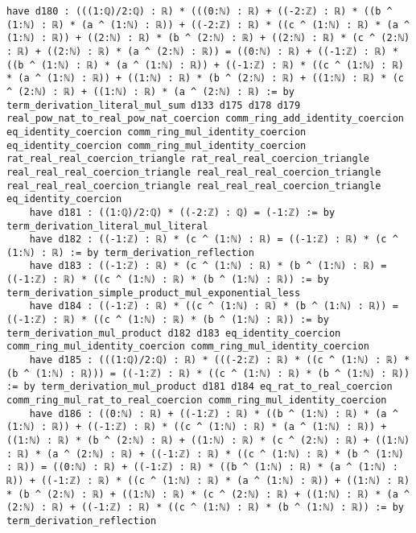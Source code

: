 \documentclass{article}
\begin{document}
\begin{tcolorbox}[colback=white!10, width=\linewidth]
\begin{lstlisting}[language=Lean4]
    have d180 : (((1:ℚ)/2:ℚ) : ℝ) * (((0:ℕ) : ℝ) + ((-2:ℤ) : ℝ) * ((b ^ (1:ℕ) : ℝ) * (a ^ (1:ℕ) : ℝ)) + ((-2:ℤ) : ℝ) * ((c ^ (1:ℕ) : ℝ) * (a ^ (1:ℕ) : ℝ)) + ((2:ℕ) : ℝ) * (b ^ (2:ℕ) : ℝ) + ((2:ℕ) : ℝ) * (c ^ (2:ℕ) : ℝ) + ((2:ℕ) : ℝ) * (a ^ (2:ℕ) : ℝ)) = ((0:ℕ) : ℝ) + ((-1:ℤ) : ℝ) * ((b ^ (1:ℕ) : ℝ) * (a ^ (1:ℕ) : ℝ)) + ((-1:ℤ) : ℝ) * ((c ^ (1:ℕ) : ℝ) * (a ^ (1:ℕ) : ℝ)) + ((1:ℕ) : ℝ) * (b ^ (2:ℕ) : ℝ) + ((1:ℕ) : ℝ) * (c ^ (2:ℕ) : ℝ) + ((1:ℕ) : ℝ) * (a ^ (2:ℕ) : ℝ) := by term_derivation_literal_mul_sum d133 d175 d178 d179 real_pow_nat_to_real_pow_nat_coercion comm_ring_add_identity_coercion eq_identity_coercion comm_ring_mul_identity_coercion eq_identity_coercion comm_ring_mul_identity_coercion rat_real_real_coercion_triangle rat_real_real_coercion_triangle real_real_real_coercion_triangle real_real_real_coercion_triangle real_real_real_coercion_triangle real_real_real_coercion_triangle eq_identity_coercion
    have d181 : ((1:ℚ)/2:ℚ) * ((-2:ℤ) : ℚ) = (-1:ℤ) := by term_derivation_literal_mul_literal
    have d182 : ((-1:ℤ) : ℝ) * (c ^ (1:ℕ) : ℝ) = ((-1:ℤ) : ℝ) * (c ^ (1:ℕ) : ℝ) := by term_derivation_reflection
    have d183 : ((-1:ℤ) : ℝ) * (c ^ (1:ℕ) : ℝ) * (b ^ (1:ℕ) : ℝ) = ((-1:ℤ) : ℝ) * ((c ^ (1:ℕ) : ℝ) * (b ^ (1:ℕ) : ℝ)) := by term_derivation_simple_product_mul_exponential_less
    have d184 : ((-1:ℤ) : ℝ) * ((c ^ (1:ℕ) : ℝ) * (b ^ (1:ℕ) : ℝ)) = ((-1:ℤ) : ℝ) * ((c ^ (1:ℕ) : ℝ) * (b ^ (1:ℕ) : ℝ)) := by term_derivation_mul_product d182 d183 eq_identity_coercion comm_ring_mul_identity_coercion comm_ring_mul_identity_coercion
    have d185 : (((1:ℚ)/2:ℚ) : ℝ) * (((-2:ℤ) : ℝ) * ((c ^ (1:ℕ) : ℝ) * (b ^ (1:ℕ) : ℝ))) = ((-1:ℤ) : ℝ) * ((c ^ (1:ℕ) : ℝ) * (b ^ (1:ℕ) : ℝ)) := by term_derivation_mul_product d181 d184 eq_rat_to_real_coercion comm_ring_mul_rat_to_real_coercion comm_ring_mul_identity_coercion
    have d186 : ((0:ℕ) : ℝ) + ((-1:ℤ) : ℝ) * ((b ^ (1:ℕ) : ℝ) * (a ^ (1:ℕ) : ℝ)) + ((-1:ℤ) : ℝ) * ((c ^ (1:ℕ) : ℝ) * (a ^ (1:ℕ) : ℝ)) + ((1:ℕ) : ℝ) * (b ^ (2:ℕ) : ℝ) + ((1:ℕ) : ℝ) * (c ^ (2:ℕ) : ℝ) + ((1:ℕ) : ℝ) * (a ^ (2:ℕ) : ℝ) + ((-1:ℤ) : ℝ) * ((c ^ (1:ℕ) : ℝ) * (b ^ (1:ℕ) : ℝ)) = ((0:ℕ) : ℝ) + ((-1:ℤ) : ℝ) * ((b ^ (1:ℕ) : ℝ) * (a ^ (1:ℕ) : ℝ)) + ((-1:ℤ) : ℝ) * ((c ^ (1:ℕ) : ℝ) * (a ^ (1:ℕ) : ℝ)) + ((1:ℕ) : ℝ) * (b ^ (2:ℕ) : ℝ) + ((1:ℕ) : ℝ) * (c ^ (2:ℕ) : ℝ) + ((1:ℕ) : ℝ) * (a ^ (2:ℕ) : ℝ) + ((-1:ℤ) : ℝ) * ((c ^ (1:ℕ) : ℝ) * (b ^ (1:ℕ) : ℝ)) := by term_derivation_reflection

\end{lstlisting}
\end{tcolorbox}
\end{document}

